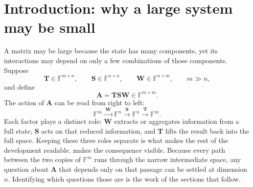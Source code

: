 \documentclass[11pt]{article}
\newcommand{\F}{\mathbb{F}}
\newcommand{\mat}[1]{\mathbf{#1}}
\theoremstyle{definition}
\theoremstyle{remark}
\begin{document}
\tableofcontents

\section{Introduction: why a large system may be small}
\label{sec:introduction}

A matrix may be large because the state has many components, yet its interactions may depend on only a few combinations of those components. Suppose
\begin{equation}
  \mat{T}\in\F^{m\times n},
  \qquad
  \mat{S}\in\F^{n\times n},
  \qquad
  \mat{W}\in\F^{n\times m},
  \qquad
  m\gg n,
  \label{eq:dimensions}
\end{equation}
and define
\begin{equation}
  \mat{A}=\mat{T}\mat{S}\mat{W}\in\F^{m\times m}.
  \label{eq:A-factorization}
\end{equation}
The action of \(\mat{A}\) can be read from right to left:
\begin{equation}
  \F^m
  \xrightarrow{\;\mat{W}\;}
  \F^n
  \xrightarrow{\;\mat{S}\;}
  \F^n
  \xrightarrow{\;\mat{T}\;}
  \F^m.
  \label{eq:factorization-diagram}
\end{equation}
Each factor plays a distinct role: \(\mat{W}\) extracts or aggregates information from a full state, \(\mat{S}\) acts on that reduced information, and \(\mat{T}\) lifts the result back into the full space. Keeping these three roles separate is what makes the rest of the development readable.  makes the consequence visible. Because every path between the two copies of \(\F^m\) runs through the narrow intermediate space, any question about \(\mat{A}\) that depends only on that passage can be settled at dimension \(n\). Identifying which questions those are is the work of the sections that follow.
\end{document}
